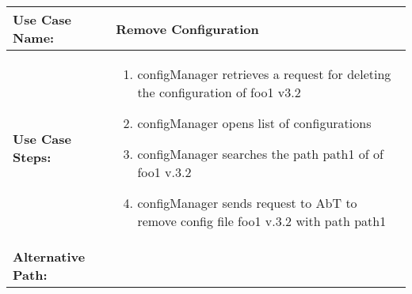 
\begin{tabularx}{\linewidth}{|l|X|}
\hline
\textbf{Use Case Name:} & \textbf{Remove Configuration} \\
\hline
\textbf{Use Case Steps:} & 
\begin{minipage}{\linewidth} 
  \vspace{0.05em}
  \begin{enumerate}
	\item configManager retrieves a request for deleting the configuration of foo1 v3.2
	\item configManager opens list of configurations
	\item configManager searches the path path1 of of foo1 v.3.2
	\item configManager sends request to AbT to remove config file foo1 v.3.2 with path path1 
  \end{enumerate}
  \vspace{0.05em}
\end{minipage}
\\
\hline 
\textbf{Alternative Path:} &
\begin{minipage}{\linewidth}
  \vspace{0.05em} 
  \vspace{0.05em} 
\end{minipage}
\\
\hline
\end{tabularx}


